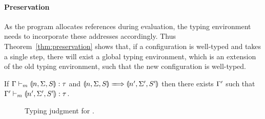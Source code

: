 \paragraph{Preservation}
As the program allocates references during evaluation, the typing environment needs to incorporate these addresses accordingly. Thus Theorem~\ref{thm:preservation} shows that, if a configuration is well-typed and takes a single step, there will exist a global typing environment, which is an extension of the old typing environment, such that the new configuration is well-typed.

\begin{theorem}[Preservation]\label{thm:preservation}
If $\hastype[m]{\tenv}{\gconfig{n}{\env}{S}}{\type}$ and $\gconfig{n}{\env}{S} \gstepsto \gconfig{n'}{\env'}{S'}$ then there exists $\Gamma'$ such that $\hastype[m]{\tenv'}{\gconfig{n'}{\env'}{S'}}{\type}$.
\end{theorem}

\begin{figure}
\centering
{}
\caption{Typing judgment for \lang.}
\label{fig:type-judgment}
\end{figure}